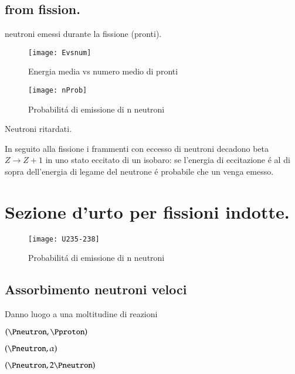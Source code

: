 \subsection{\Pneutron from fission.}

\begin{itemize*}
\item neutroni emessi durante la fissione (pronti).

\begin{figure}[!ht]
\centering
\texttt{[image: Evsnum]}
\caption{Energia media vs numero medio di \Pneutron pronti}
\end{figure}

\begin{figure}[!ht]
\centering
\texttt{[image: nProb]}
\caption{Probabilit\'a di emissione di n neutroni}
\end{figure}

\item Neutroni ritardati.

In seguito alla fissione i frammenti con eccesso di neutroni decadono beta $Z\to Z+1$ in uno stato eccitato di un isobaro: se l'energia di eccitazione \'e al di sopra dell'energia di legame del neutrone \'e probabile che un \Pneutron venga emesso.  

\end{itemize*}

\clearpage

\section{Sezione d'urto per fissioni indotte.}

\begin{figure}[!ht]
\centering
\texttt{[image: U235-238]}
\caption{Probabilit\'a di emissione di n neutroni}
\end{figure}


\subsection{Assorbimento neutroni veloci}
Danno luogo a una moltitudine di reazioni
\begin{itemize*}
\item $(\Pneutron,\Pproton)$
\item $(\Pneutron,\alpha)$
\item $(\Pneutron,2\Pneutron)$
\end{itemize*}

